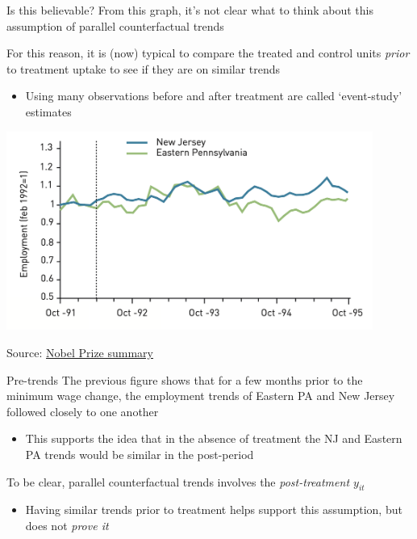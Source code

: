 \documentclass[aspectratio=169,t,11pt,table]{beamer}
\begin{document}

\begin{frame}{Is this believable?}
  From this graph, it's not clear what to think about this assumption of parallel counterfactual trends

  \bigskip
  For this reason, it is (now) typical to compare the treated and control units \emph{prior} to treatment uptake to see if they are on similar trends
  \begin{itemize}
    \item Using many observations before and after treatment are called `event-study' estimates
  \end{itemize}
\end{frame}

\begin{frame}{}
  \begin{center}
    \includegraphics[width= 0.9\textwidth]{figures/card_krueger_event_study.png}
    
    Source: \href{https://www.nobelprize.org/uploads/2021/10/fig3_ek_en_21_effectIncreasingMinimunWage.pdf}{Nobel Prize summary} 
  \end{center}
\end{frame}

\begin{frame}{Pre-trends}
  The previous figure shows that for a few months prior to the minimum wage change, the employment trends of Eastern PA and New Jersey followed closely to one another
  \begin{itemize}
    \item This supports the idea that in the absence of treatment the NJ and Eastern PA trends would be similar in the post-period
  \end{itemize}

  \pause
  \bigskip
  To be clear, parallel counterfactual trends involves the \emph{post-treatment $y_{it}$}
  \begin{itemize}
    \item Having similar trends prior to treatment helps support this assumption, but does not \emph{prove it}
  \end{itemize}
\end{frame}
\end{document}
